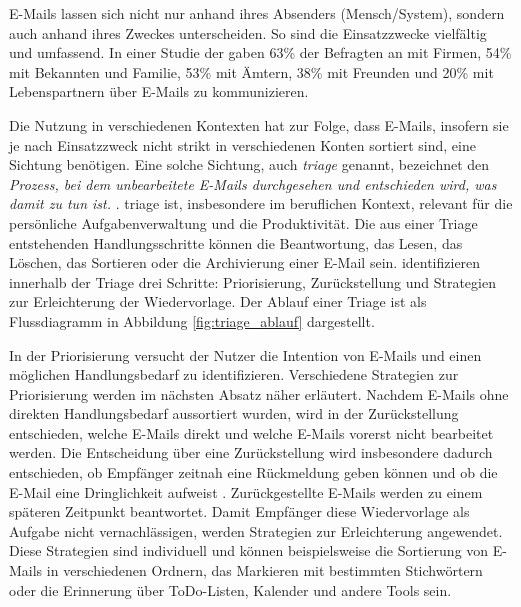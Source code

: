 E-Mails lassen sich nicht nur anhand ihres Absenders (Mensch/System), sondern auch anhand ihres Zweckes unterscheiden. So sind die Einsatzzwecke vielfältig und umfassend. In einer Studie der \cite{MMG2020} gaben 63\% der Befragten an mit Firmen, 54\% mit Bekannten und Familie, 53\% mit Ämtern, 38\% mit Freunden und 20\% mit Lebenspartnern über E-Mails zu kommunizieren.

Die Nutzung in verschiedenen Kontexten hat zur Folge, dass E-Mails, insofern sie je nach Einsatzzweck nicht strikt in verschiedenen Konten sortiert sind, eine Sichtung benötigen. Eine solche Sichtung, auch \textit{\gls{triage}} genannt, bezeichnet den \emph{\glqq[...] Prozess, bei dem unbearbeitete E-Mails durchgesehen und entschieden wird, was damit zu tun ist.\grqq{}} \citep[S. 325]{Sarrafzadeh2019}. \gls{triage} ist, insbesondere im beruflichen Kontext, relevant für die persönliche Aufgabenverwaltung und die Produktivität. Die aus einer Triage entstehenden Handlungsschritte können die Beantwortung, das Lesen, das Löschen, das Sortieren oder die Archivierung einer E-Mail sein. \cite{Sarrafzadeh2019} identifizieren innerhalb der Triage drei Schritte: Priorisierung, Zurückstellung und Strategien zur Erleichterung der Wiedervorlage. Der Ablauf einer Triage ist als Flussdiagramm in Abbildung \ref{fig:triage_ablauf} dargestellt.

In der Priorisierung versucht der Nutzer die Intention von E-Mails und einen möglichen Handlungsbedarf zu identifizieren. Verschiedene Strategien zur Priorisierung werden im nächsten Absatz näher erläutert. Nachdem E-Mails ohne direkten Handlungsbedarf aussortiert wurden, wird in der Zurückstellung entschieden, welche E-Mails direkt und welche E-Mails vorerst nicht bearbeitet werden. Die Entscheidung über eine Zurückstellung wird insbesondere dadurch entschieden, ob Empfänger zeitnah eine Rückmeldung geben können und ob die E-Mail eine Dringlichkeit aufweist \citep[S. 327]{Sarrafzadeh2019}. Zurückgestellte E-Mails werden zu einem späteren Zeitpunkt beantwortet. Damit Empfänger diese Wiedervorlage als Aufgabe nicht vernachlässigen, werden Strategien zur Erleichterung angewendet. Diese Strategien sind individuell und können beispielsweise die Sortierung von E-Mails in verschiedenen Ordnern, das Markieren mit bestimmten Stichwörtern oder die Erinnerung über ToDo-Listen, Kalender und andere Tools sein.


